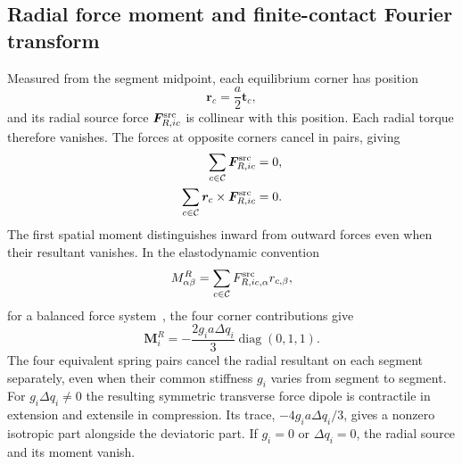 \documentclass[10pt,aps,onecolumn,floatfix,notitlepage,nofootinbib,showkeys]{revtex4-2}
\newcommand{\vF}{\bm{F}}
\newcommand{\vrr}{\bm{r}}
\newcommand{\vt}{\bm{t}}
\newcommand{\Cc}{\mathcal C}
\begin{document}
\subsection{Radial force moment and finite-contact Fourier transform}
\label{sec:s3-dipole-fourier}

Measured from the segment midpoint, each equilibrium corner has position
\begin{equation}
  \vrr_c=\frac{a}{2}\vt_c,
  \label{eq:s3-corner-radius}
\end{equation}
and its radial source force $\vF^{\rm src}_{R,ic}$ is collinear with this position. Each radial torque therefore vanishes. The forces at opposite corners cancel in pairs, giving
\begin{align}
  \sum_{c\in\Cc}\vF^{\rm src}_{R,ic}&=0,\label{eq:s3-radial-resultant}\\
  \sum_{c\in\Cc}\vrr_c\times\vF^{\rm src}_{R,ic}&=0.
  \label{eq:s3-radial-balance}
\end{align}
The first spatial moment distinguishes inward from outward forces even when their resultant vanishes. In the elastodynamic convention
\begin{equation}
  M^R_{\alpha\beta}
  =\sum_{c\in\Cc}F^{\rm src}_{R,ic,\alpha}r_{c,\beta},
  \label{eq:s3-moment-definition}
\end{equation}
for a balanced force system~\cite{AkiRichards2002}, the four corner contributions give
\begin{equation}
  \bm M_i^R
  =-\frac{2g_i a\Delta q_i}{3}
  \operatorname{diag}(0,1,1).
  \label{eq:s3-radial-dipole}
\end{equation}
The four equivalent spring pairs cancel the radial resultant on each segment separately, even when their common stiffness $g_i$ varies from segment to segment. For $g_i\Delta q_i\ne0$ the resulting symmetric transverse force dipole is contractile in extension and extensile in compression. Its trace, $-4g_i a\Delta q_i/3$, gives a nonzero isotropic part alongside the deviatoric part. If $g_i=0$ or $\Delta q_i=0$, the radial source and its moment vanish.
\end{document}

